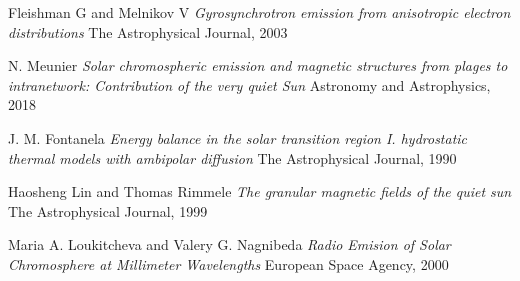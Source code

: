 \documentclass[9pt]{book}
\begin{document}
\begin{thebibliography}{9}
Fleishman G and Melnikov V
\textit{Gyrosynchrotron emission from anisotropic electron distributions} 
The Astrophysical Journal, 2003

N. Meunier
\textit{Solar chromospheric emission and magnetic structures from plages to intranetwork: Contribution of the very quiet Sun} 
Astronomy and Astrophysics, 2018

J. M. Fontanela
\textit{Energy balance in the solar transition region I. hydrostatic thermal models with ambipolar diffusion} 
The Astrophysical Journal, 1990

Haosheng Lin and Thomas Rimmele
\textit{The granular magnetic fields of the quiet sun} 
The Astrophysical Journal, 1999

Maria A. Loukitcheva and Valery G. Nagnibeda
\textit{Radio Emision of Solar Chromosphere at Millimeter Wavelengths} 
European Space Agency, 2000

\end{thebibliography}
\end{document}
